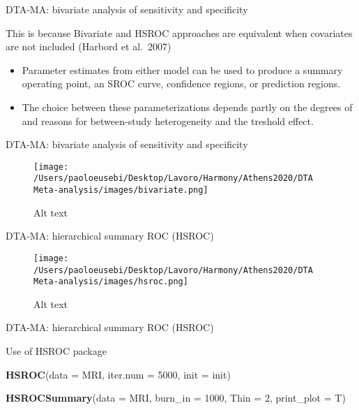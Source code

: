 \documentclass[
  ignorenonframetext,
  aspectratio=43,
]{beamer}
\newenvironment{Shaded}{\begin{snugshade}}{\end{snugshade}}
\newcommand{\DataTypeTok}[1]{\textcolor[rgb]{0.13,0.29,0.53}{#1}}
\newcommand{\DecValTok}[1]{\textcolor[rgb]{0.00,0.00,0.81}{#1}}
\newcommand{\KeywordTok}[1]{\textcolor[rgb]{0.13,0.29,0.53}{\textbf{#1}}}
\newcommand{\NormalTok}[1]{#1}
\begin{document}
\begin{frame}{DTA-MA: bivariate analysis of sensitivity and specificity}
\protect\hypertarget{dta-ma-bivariate-analysis-of-sensitivity-and-specificity-3}{}

This is because Bivariate and HSROC approaches are equivalent when
covariates are not included (Harbord et al.~2007)

\begin{itemize}
\item
  Parameter estimates from either model can be used to produce a summary
  operating point, an SROC curve, confidence regions, or prediction
  regions.
\item
  The choice between these parameterizations depends partly on the
  degrees of and reasons for between-study heterogeneity and the
  treshold effect.
\end{itemize}

\end{frame}

\begin{frame}{DTA-MA: bivariate analysis of sensitivity and specificity}
\protect\hypertarget{dta-ma-bivariate-analysis-of-sensitivity-and-specificity-4}{}

\begin{figure}
\centering
\texttt{[image: /Users/paoloeusebi/Desktop/Lavoro/Harmony/Athens2020/DTA Meta-analysis/images/bivariate.png]}
\caption{Alt text}
\end{figure}

\end{frame}

\begin{frame}{DTA-MA: hierarchical summary ROC (HSROC)}
\protect\hypertarget{dta-ma-hierarchical-summary-roc-hsroc}{}

\begin{figure}
\centering
\texttt{[image: /Users/paoloeusebi/Desktop/Lavoro/Harmony/Athens2020/DTA Meta-analysis/images/hsroc.png]}
\caption{Alt text}
\end{figure}

\end{frame}

\begin{frame}[fragile]{DTA-MA: hierarchical summary ROC (HSROC)}
\protect\hypertarget{dta-ma-hierarchical-summary-roc-hsroc-1}{}

Use of HSROC package

\begin{Shaded}
\begin{Highlighting}[]
\KeywordTok{HSROC}\NormalTok{(}\DataTypeTok{data =}\NormalTok{ MRI,}
      \DataTypeTok{iter.num =} \DecValTok{5000}\NormalTok{,}
      \DataTypeTok{init =}\NormalTok{ init)}

\KeywordTok{HSROCSummary}\NormalTok{(}\DataTypeTok{data =}\NormalTok{ MRI,}
             \DataTypeTok{burn_in =} \DecValTok{1000}\NormalTok{,}
             \DataTypeTok{Thin =} \DecValTok{2}\NormalTok{,}
             \DataTypeTok{print_plot =}\NormalTok{ T)}
\end{Highlighting}
\end{Shaded}

\end{frame}
\end{document}
